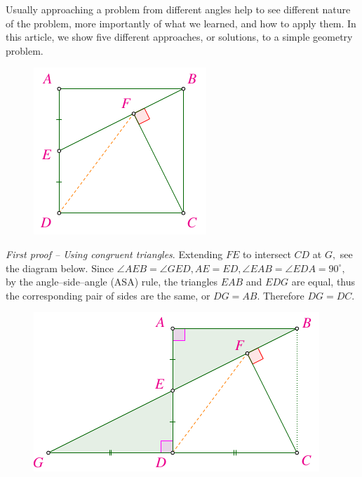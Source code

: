 \begin{multicols}{2}
	Usually approaching a problem from different angles help to see different nature of the problem,
	more importantly of what we learned, and how to apply them.
	In this article, we show five different approaches, or solutions, to a simple geometry problem.
	\vskip 0.2cm
	\begin{figure}[H]
		\vspace*{-5pt}
		\centering
		\captionsetup{labelformat= empty, justification=centering}
		\includegraphics[width= 0.7\linewidth]{2022-2-ms-1-1.pdf}
		\vspace*{-15pt}
	\end{figure}
	\textit{First proof -- Using congruent triangles}.
	Extending $FE$ to intersect $CD$ at $G,$ see the diagram below. 
	Since $\angle AEB = \angle GED, AE = ED, \angle EAB = \angle EDA = 90^\circ,$
	by the angle--side--angle (ASA) rule, the triangles $ EAB$ and $EDG$ are equal,
	thus the corresponding pair of sides are the same, or $DG=AB$. Therefore $DG=DC.$
	\begin{figure}[H]
		\vspace*{-5pt}
		\centering
		\captionsetup{labelformat= empty, justification=centering}
		\includegraphics[width= 1\linewidth]{2022-2-ms-1-1-a.pdf}

\end{figure}
\end{multicols}
